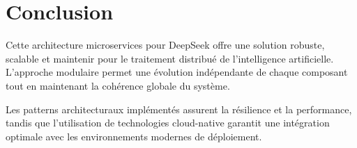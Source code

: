 \documentclass[12pt,a4paper]{article}
\begin{document}
\section{Conclusion}

Cette architecture microservices pour DeepSeek offre une solution robuste, scalable et maintenir pour le traitement distribué de l'intelligence artificielle. L'approche modulaire permet une évolution indépendante de chaque composant tout en maintenant la cohérence globale du système.

Les patterns architecturaux implémentés assurent la résilience et la performance, tandis que l'utilisation de technologies cloud-native garantit une intégration optimale avec les environnements modernes de déploiement.
\end{document}
